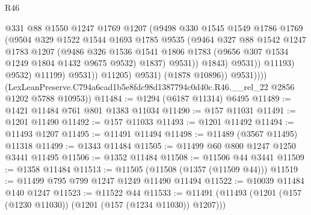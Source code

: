 \begin{lexlean}{R46}
\begin{coremodule}
                                  @331
                                  @88
                                  @1550
                                  @1247
                                  @1769
                                  @1207
                                  (@9498
                                    @330
                                    @1545
                                    @1549
                                    @1786
                                    @1769
                                    (@9504
                                      @329
                                      @1522
                                      @1544
                                      @1693
                                      @1785
                                      @9535
                                      (@9464
                                        @327
                                        @88
                                        @1542
                                        @1247
                                        @1783
                                        @1207
                                        (@9486
                                          @326
                                          @1536
                                          @1541
                                          @1806
                                          @1783
                                          (@9656 @307 @1534 @1249 @1804 @1432 @9675 @9532)
                                          @1837)
                                        @9531))
                                    @1843)
                                  @9531))
                              @11193)
                            @9532)
                          @11199)
                        @9531))
                    @11205)
                  @9531)
                (@1878 @10896))
              @9531))))
      (LexLeanPreserve.C794a6cad1b5e8fdc98d1387794c0d40c.R46.__rel_22 @2856 @1202 @5788 @10953))
@11484 := @1294 (@6187 @11314) @6495
@11489 := @1421 @11484 @761 @801 @1383 @11034
@11490 := @157 @11031
@11491 := @1201 @11490
@11492 := @157 @11033
@11493 := @1201 @11492
@11494 := @11493 @1207
@11495 := @11491 @11494
@11498 := @11489 (@3567 @11495) @11318
@11499 := @1343 @11484
@11505 := @11499 @60 @800 @1247 @1250 @3441 @11495
@11506 := @1352 @11484
@11508 := @11506 @44 @3441
@11509 := @1358 @11484
@11513 := @11505 (@11508 (@1357 (@11509 @44)))
@11519 := @11499 @795 @799 @1247 @1249 @11490 @11494
@11522 := @10039 @11484 @140 @1247
@11523 := @11522 @44
@11533 := @11491 (@11493 (@1201 (@157 (@1230 @11030)) (@1201 (@157 (@1234 @11030)) @1207)))

\end{coremodule}
\end{lexlean}
